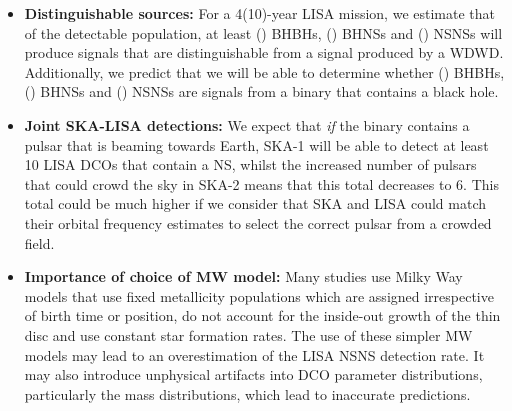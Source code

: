 \begin{itemize}
    \item \textbf{Distinguishable sources:} For a 4(10)-year LISA mission, we estimate that of the detectable population, at least \BHBHNotWDWDFour{}(\BHBHNotWDWDTen{}) BHBHs, \BHNSNotWDWDFour{}(\BHNSNotWDWDTen{}) BHNSs and \NSNSNotWDWDFour{}(\NSNSNotWDWDTen{}) NSNSs will produce signals that are distinguishable from a signal produced by a WDWD. Additionally, we predict that we will be able to determine whether \BHBHEitherBHOrNSFour{}(\BHBHEitherBHOrNSTen{}) BHBHs, \BHNSEitherBHOrNSFour{}(\BHNSEitherBHOrNSTen{}) BHNSs and \NSNSEitherBHOrNSFour{}(\NSNSEitherBHOrNSTen{}) NSNSs are signals from a binary that contains a black hole.
    \item \textbf{Joint SKA-LISA detections:} We expect that \textit{if} the binary contains a pulsar that is beaming towards Earth, SKA-1 will be able to detect at least 10 LISA DCOs that contain a NS, whilst the increased number of pulsars that could crowd the sky in SKA-2 means that this total decreases to 6. This total could be much higher if we consider that SKA and LISA could match their orbital frequency estimates to select the correct pulsar from a crowded field.
    \item \textbf{Importance of choice of MW model:} Many studies use Milky Way models that use fixed metallicity populations which are assigned irrespective of birth time or position, do not account for the inside-out growth of the thin disc and use constant star formation rates. The use of these simpler MW models may lead to an overestimation of the LISA NSNS detection rate. It may also introduce unphysical artifacts into DCO parameter distributions, particularly the mass distributions, which lead to inaccurate predictions.
\end{itemize}